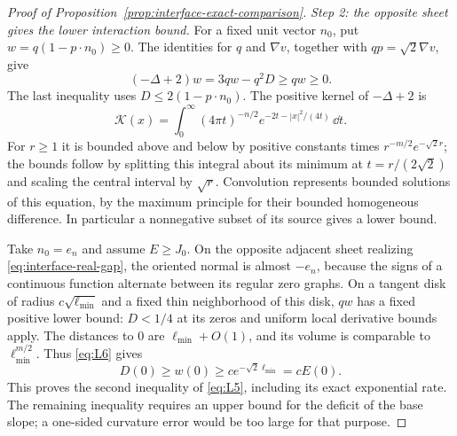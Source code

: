 \begin{proof}[Proof of Proposition~\ref{prop:interface-exact-comparison}]
\emph{Step 2: the opposite sheet gives the lower interaction bound.}
For a fixed unit vector $n_0$, put $w=q(1-p\cdot n_0)\ge0$.
The identities for $q$ and $\nabla v$, together with
$q p=\sqrt2\nabla v$, give
\begin{equation}\label{eq:L6}
 (-\Delta+2)w=3qw-q^2D\ge qw\ge0.
\end{equation}
The last inequality uses
$D\le2(1-p\cdot n_0)$.
The positive kernel of $-\Delta+2$ is
\[
 \mathcal K(x)=\int_0^\infty(4\pi t)^{-n/2}
                       e^{-2t-|x|^2/(4t)}\,\dd t.
\]
For $r\ge1$ it is bounded above and below by positive constants
times $r^{-m/2}e^{-\sqrt2 r}$; the bounds follow by splitting this
integral about its minimum at $t=r/(2\sqrt2)$ and scaling the
central interval by $\sqrt r$.  Convolution represents bounded
solutions of this equation, by the maximum principle for their
bounded homogeneous difference.  In particular a nonnegative
subset of its source gives a lower bound.

Take $n_0=e_n$ and assume $E\ge J_0$.  On the opposite adjacent
sheet realizing \eqref{eq:interface-real-gap}, the oriented normal
is almost $-e_n$, because the signs of a continuous function alternate
between its regular zero graphs.  On a tangent disk of radius
$c\sqrt{\ell_{\min}}$ and a fixed thin neighborhood of this disk,
$q w$ has a fixed positive lower bound: $D<1/4$ at its zeros and
uniform local derivative bounds apply.  The distances to $0$ are
$\ell_{\min}+O(1)$, and its volume is comparable to
$\ell_{\min}^{m/2}$.  Thus \eqref{eq:L6} gives
\[
 D(0)\ge w(0)\ge c e^{-\sqrt2\ell_{\min}}=cE(0).
\]
This proves the second inequality of \eqref{eq:L5}, including its
exact exponential rate.  The remaining inequality requires an upper
bound for the deficit of the base slope; a one-sided curvature error
would be too large for that purpose.


\end{proof}
